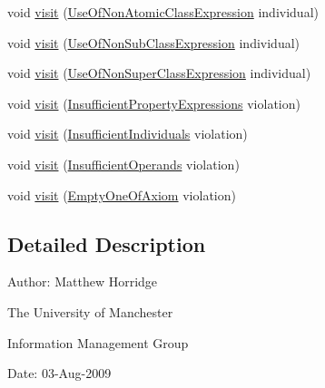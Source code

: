\begin{DoxyCompactItemize}
void \hyperlink{interfaceorg_1_1semanticweb_1_1owlapi_1_1profiles_1_1_o_w_l2_q_l_profile_violation_visitor_a52c74bee9bb4db2dee9ad56269049251}{visit} (\hyperlink{classorg_1_1semanticweb_1_1owlapi_1_1profiles_1_1_use_of_non_atomic_class_expression}{Use\-Of\-Non\-Atomic\-Class\-Expression} individual)
\item 
void \hyperlink{interfaceorg_1_1semanticweb_1_1owlapi_1_1profiles_1_1_o_w_l2_q_l_profile_violation_visitor_a27802476af1b6990ce6f38d1bda2ef89}{visit} (\hyperlink{classorg_1_1semanticweb_1_1owlapi_1_1profiles_1_1_use_of_non_sub_class_expression}{Use\-Of\-Non\-Sub\-Class\-Expression} individual)
\item 
void \hyperlink{interfaceorg_1_1semanticweb_1_1owlapi_1_1profiles_1_1_o_w_l2_q_l_profile_violation_visitor_a5a095f3f405ef7d372723d0d4559ce3e}{visit} (\hyperlink{classorg_1_1semanticweb_1_1owlapi_1_1profiles_1_1_use_of_non_super_class_expression}{Use\-Of\-Non\-Super\-Class\-Expression} individual)
\item 
void \hyperlink{interfaceorg_1_1semanticweb_1_1owlapi_1_1profiles_1_1_o_w_l2_q_l_profile_violation_visitor_a76f590a14cbdf7c8c086dcce3883139e}{visit} (\hyperlink{classorg_1_1semanticweb_1_1owlapi_1_1profiles_1_1_insufficient_property_expressions}{Insufficient\-Property\-Expressions} violation)
\item 
void \hyperlink{interfaceorg_1_1semanticweb_1_1owlapi_1_1profiles_1_1_o_w_l2_q_l_profile_violation_visitor_ac839a924f01fc2e0c05526fdde6d2979}{visit} (\hyperlink{classorg_1_1semanticweb_1_1owlapi_1_1profiles_1_1_insufficient_individuals}{Insufficient\-Individuals} violation)
\item 
void \hyperlink{interfaceorg_1_1semanticweb_1_1owlapi_1_1profiles_1_1_o_w_l2_q_l_profile_violation_visitor_abdae2e9dd28fa65a3d24839ae1a4cf78}{visit} (\hyperlink{classorg_1_1semanticweb_1_1owlapi_1_1profiles_1_1_insufficient_operands}{Insufficient\-Operands} violation)
\item 
void \hyperlink{interfaceorg_1_1semanticweb_1_1owlapi_1_1profiles_1_1_o_w_l2_q_l_profile_violation_visitor_a9e5f6f9d7bf660d936e89d7455a7593d}{visit} (\hyperlink{classorg_1_1semanticweb_1_1owlapi_1_1profiles_1_1_empty_one_of_axiom}{Empty\-One\-Of\-Axiom} violation)
\end{DoxyCompactItemize}


\subsection{Detailed Description}
Author\-: Matthew Horridge\par
 The University of Manchester\par
 Information Management Group\par
 Date\-: 03-\/\-Aug-\/2009 

